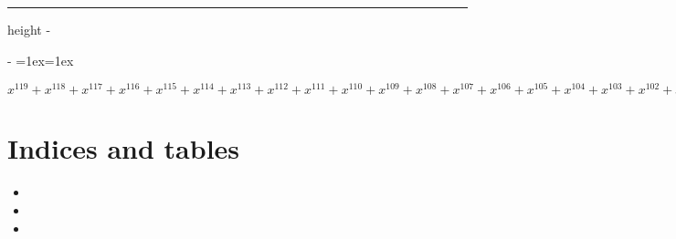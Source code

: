 \documentclass[letterpaper,10pt,english]{sphinxmanual}
\makeatletter
\newenvironment{nbsphinxfancyoutput}{%
    \let\sphinxincludegraphics\nbsphinxincludegraphics
    \nbsphinx@image@maxheight\textheight
    \advance\nbsphinx@image@maxheight -2\fboxsep   %
    \advance\nbsphinx@image@maxheight -2\fboxrule  %
    \advance\nbsphinx@image@maxheight -\baselineskip
\def\nbsphinxfcolorbox{\spx@fcolorbox{nbsphinx-code-border}{white}}%
\def\FrameCommand{\nbsphinxfcolorbox\nbsphinxfancyaddprompt\@empty}%
\def\FirstFrameCommand{\nbsphinxfcolorbox\nbsphinxfancyaddprompt\sphinxVerbatim@Continues}%
\def\MidFrameCommand{\nbsphinxfcolorbox\sphinxVerbatim@Continued\sphinxVerbatim@Continues}%
\def\LastFrameCommand{\nbsphinxfcolorbox\sphinxVerbatim@Continued\@empty}%
\MakeFramed{\advance\hsize-\width\@totalleftmargin\z@\linewidth\hsize\@setminipage}%
\lineskip=1ex\lineskiplimit=1ex\raggedright%
}{\par\unskip\@minipagefalse\endMakeFramed}
\def\nbsphinxfancyaddprompt{\ifvoid\nbsphinxpromptbox\else
    \kern\fboxrule\kern\fboxsep
    \copy\nbsphinxpromptbox
    \kern-\ht\nbsphinxpromptbox\kern-\dp\nbsphinxpromptbox
    \kern-\fboxsep\kern-\fboxrule\nointerlineskip
    \fi}
\newlength\nbsphinxcodecellspacing
\newcommand*{\nbsphinxincludegraphics}[2][]{%
    \gdef\spx@includegraphics@options{#1}%
    \setbox\spx@image@box\hbox{\texttt{[image: \#2]}}%
    \in@false
    \ifdim \wd\spx@image@box>\linewidth
      \g@addto@macro\spx@includegraphics@options{,width=\linewidth}%
      \in@true
    \fi
    \ifdim \ht\spx@image@box>\nbsphinx@image@maxheight
      \g@addto@macro\spx@includegraphics@options{,height=\nbsphinx@image@maxheight}%
      \in@true
    \fi
    \ifin@
      \g@addto@macro\spx@includegraphics@options{,keepaspectratio}%
    \fi
    \setbox\spx@image@box\box\voidb@x %
    \expandafter\includegraphics\expandafter[\spx@includegraphics@options]{#2}%
}%
\makeatother
\begin{document}
{
\begin{sphinxVerbatim}[commandchars=\\\{\}]
\llap{\color{nbsphinxin}[1]:\,\hspace{\fboxrule}\hspace{\fboxsep}}
   
  
  
   
      
\end{sphinxVerbatim}
}

\hrule height -\fboxrule\relax
\vspace{\nbsphinxcodecellspacing}

\savebox\nbsphinxpromptbox[0pt][r]{\color{nbsphinxout}\Verb|\strut{[1]:}\,|}

\begin{nbsphinxfancyoutput}
$\displaystyle x^{119} + x^{118} + x^{117} + x^{116} + x^{115} + x^{114} + x^{113} + x^{112} + x^{111} + x^{110} + x^{109} + x^{108} + x^{107} + x^{106} + x^{105} + x^{104} + x^{103} + x^{102} + x^{101} + x^{100} + x^{99} + x^{98} + x^{97} + x^{96} + x^{95} + x^{94} + x^{93} + x^{92} + x^{91} + x^{90} + x^{89} + x^{88} + x^{87} + x^{86} + x^{85} + x^{84} + x^{83} + x^{82} + x^{81} + x^{80} + x^{79} + x^{78} + x^{77} + x^{76} + x^{75} + x^{74} + x^{73} + x^{72} + x^{71} + x^{70} + x^{69} + x^{68} + x^{67} + x^{66} + x^{65} + x^{64} + x^{63} + x^{62} + x^{61} + x^{60} + x^{59} + x^{58} + x^{57} + x^{56} + x^{55} + x^{54} + x^{53} + x^{52} + x^{51} + x^{50} + x^{49} + x^{48} + x^{47} + x^{46} + x^{45} + x^{44} + x^{43} + x^{42} + x^{41} + x^{40} + x^{39} + x^{38} + x^{37} + x^{36} + x^{35} + x^{34} + x^{33} + x^{32} + x^{31} + x^{30} + x^{29} + x^{28} + x^{27} + x^{26} + x^{25} + x^{24} + x^{23} + x^{22} + x^{21} + x^{20} + x^{19} + x^{18} + x^{17} + x^{16} + x^{15} + x^{14} + x^{13} + x^{12} + x^{11} + x^{10} + x^{9} + x^{8} + x^{7} + x^{6} + x^{5} + x^{4} + x^{3} + x^{2} + 2 x + 1$
\end{nbsphinxfancyoutput}


\chapter{Indices and tables}
\label{\detokenize{index:indices-and-tables}}\begin{itemize}
\item {} 

\item {} 

\item {} 

\end{itemize}



\renewcommand{\indexname}{Index}
\printindex
\end{document}
